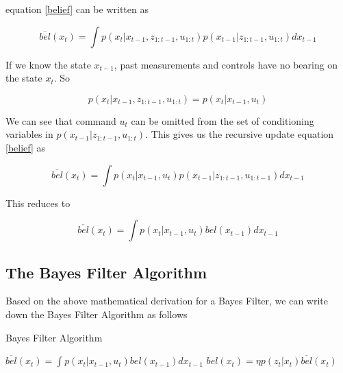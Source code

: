 \documentclass[conference]{IEEEtran}
\begin{document}
equation \ref{belief} can be written as 

\begin{equation}
\overline{bel}(x_t) = \int p(x_t|x_{t-1}, z_{1:t-1}, u_{1:t}) p(x_{t-1}|z_{1:t-1}, u_{1:t}) dx_{t-1}
\end{equation}

If we know the state $x_{t-1}$, past measurements and controls have no bearing on the state $x_t$. So

\begin{equation}
p(x_t|x_{t-1}, z_{1:t-1}, u_{1:t}) = p(x_t|x_{t-1}, u_t)
\end{equation}

We can see that command $u_t$ can be omitted from the set of conditioning variables in $p(x_{t-1}|z_{1:t-1}, u_{1:t})$. This gives us the recursive update equation \ref{belief} as

\begin{equation}
\overline{bel}(x_t) = \int p(x_t|x_{t-1}, u_t) p(x_{t-1}|z_{1:t-1}, u_{1:t-1}) dx_{t-1}
\end{equation}

This reduces to

\begin{equation}
\overline{bel}(x_t) = \int p(x_t|x_{t-1}, u_t) bel(x_{t-1}) dx_{t-1}
\end{equation}

\subsection{The Bayes Filter Algorithm}

Based on the above mathematical derivation for a Bayes Filter, we can write down the Bayes Filter Algorithm as follows

  \begin{minipage}{\linewidth}
  \begin{algorithm}[H]
    \caption{Bayes Filter Algorithm}\label{euclid}
    \begin{algorithmic}[1]
		\State $\overline{bel}(x_t) = \int p(x_t|x_{t-1}, u_t) bel(x_{t-1}) dx_{t-1}$
		\State $bel(x_t)= \eta p(z_t|x_t) \overline{bel}(x_t)$
	\EndFor
      \EndProcedure
    \end{algorithmic}
  \end{algorithm}
  \end{minipage}\\\\
\end{document}
